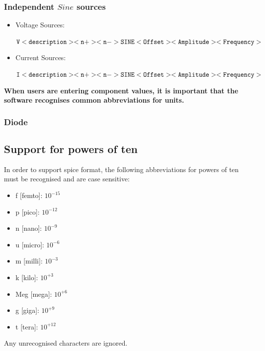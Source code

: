 \documentclass[a4paper, titlepage]{article}
\begin{document}
    \subsubsection{Independent $Sine$ sources}
    \begin{itemize}
        \item Voltage Sources: 
        \begin{center}
            $\tt V<description> <n+> <n->SINE<Offset><Amplitude><Frequency>$
        \end{center}
        \item Current Sources:
        \begin{center}
            $\tt I<description> <n+> <n->SINE<Offset><Amplitude><Frequency>$
        \end{center}
    \end{itemize}
    \textbf {When users are entering component values, it is important that the software recognises common abbreviations 
    for units.}
    \subsubsection{Diode}

    \pagebreak
    \subsection{Support for powers of ten}
    In order to support {\selectfont spice} format, the following abbreviations for powers of ten 
    must be recognised and are case sensitive:
    \begin{multicols}{2}
    \begin{itemize}
        \item f [femto]: $ 10^{-15} $
        \item p [pico]: $ 10^{-12} $
        \item n [nano]: $ 10^{-9} $
        \item u [micro]: $ 10^{-6} $
        \item m [milli]: $ 10^{-3} $
        \item k [kilo]: $ 10^{+3} $
        \item Meg [mega]: $ 10^{+6} $
        \item g [giga]: $ 10^{+9} $
        \item t [tera]: $ 10^{+12} $
    \end{itemize}
    \end{multicols}
    Any unrecognised characters are ignored.
    
\end{document}
